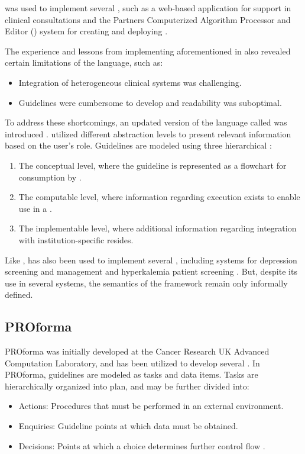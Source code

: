 \GLIF{} was used to implement several \CDSSs{}, such as a web-based
application for support in clinical consultations \cite{BoxwalaAMIA99} and
the Partners Computerized Algorithm Processor and Editor (\PCAPE{}) system
for creating and deploying \BPGs{} \cite{ZielstorffAMIA98}.

The experience and lessons from implementing aforementioned \CDSSs{} in
\GLIF{} also revealed certain limitations of the language, such as:
\begin{itemize}
  \item Integration of heterogeneous clinical systems was challenging.
  \item Guidelines were cumbersome to develop and readability was suboptimal.
\end{itemize}

To address these shortcomings, an updated version of the language called
 was introduced  \cite{PelegAMIA00}.  utilized different
abstraction levels to present relevant information based on the user's role.
Guidelines are modeled using three hierarchical :
\begin{enumerate}[label=\roman*.]
  \item The conceptual level, where the guideline is represented as
    a flowchart for consumption by \HCPs{}.
  \item The computable level, where information regarding
    execution exists to enable use in a \CDSS{}.
  \item The implementable level, where additional information
    regarding integration with institution-specific \EHRs{} resides.
\end{enumerate}
Like \GLIF{},  has also  been used to implement several \CDSSs{}, including
systems for depression screening and management \cite{ChoiJMI07} and
hyperkalemia patient screening \cite{WangBook04}. But, despite its use
in several systems, the semantics of the \GLIF{} framework remain only informally
defined.


\subsection{PROforma}\label{sec:proforma}

PROforma was initially developed at the Cancer Research UK Advanced Computation
Laboratory, and has been utilized to develop several \CDSSs{} \cite{ClerqAIM03}.
In PROforma, guidelines are modeled as tasks and data items. Tasks are
hierarchically organized into plan, and may be further divided into:
\begin{itemize}
  \item Actions: Procedures that must be performed in an external environment.
  \item Enquiries: Guideline points at which data must be obtained.
  \item Decisions: Points at which a choice determines further control flow
    \cite{SuttonAMIA03}.
\end{itemize}

